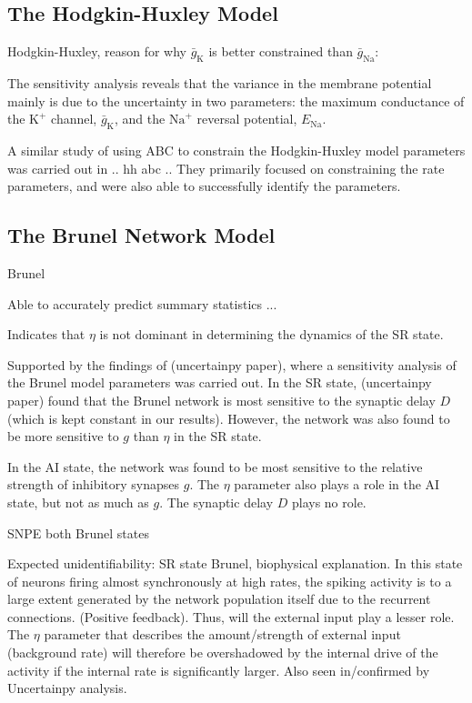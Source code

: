 \subsection{The Hodgkin-Huxley Model}

Hodgkin-Huxley, reason for why $\bar{g}_\mathrm{K}$ is better constrained than $\bar{g}_\mathrm{Na}$:

The sensitivity analysis reveals that the variance in the membrane potential mainly is due to the uncertainty in two parameters: the maximum conductance of the $\mathrm{K}^+$ channel, $\bar{g}_\mathrm{K}$, and the $\mathrm{Na}^+$ reversal potential, $E_\mathrm{Na}$.

A similar study of using ABC to constrain the Hodgkin-Huxley model parameters was carried out in .. hh abc .. They primarily focused on constraining the rate parameters, and were also able to successfully identify the parameters.  


\subsection{The Brunel Network Model}

Brunel 

Able to accurately predict summary statistics ...

Indicates that $\eta$ is not dominant in determining the dynamics of the SR state. 

Supported by the findings of (uncertainpy paper), where a sensitivity analysis of the Brunel model parameters was carried out. In the SR state, (uncertainpy paper) found that the Brunel network is most sensitive to the synaptic delay $D$ (which is kept constant in our results). However, the network was also found to be more sensitive to $g$ than $\eta$ in the SR state. 

In the AI state, the network was found to be most sensitive to the relative strength of inhibitory synapses $g$. The $\eta$ parameter also plays a role in the AI state, but not as much as $g$. The synaptic delay $D$ plays no role. 

SNPE both Brunel states

Expected unidentifiability: SR state Brunel, biophysical explanation. In this state of neurons firing almost synchronously at high rates, the spiking activity is to a large extent generated by the network population itself due to the recurrent connections. (Positive feedback). Thus, will the external input play a lesser role. The $\eta$ parameter that describes the amount/strength of external input (background rate) will therefore be overshadowed by the internal drive of the activity if the internal rate is significantly larger. Also seen in/confirmed by Uncertainpy analysis.

